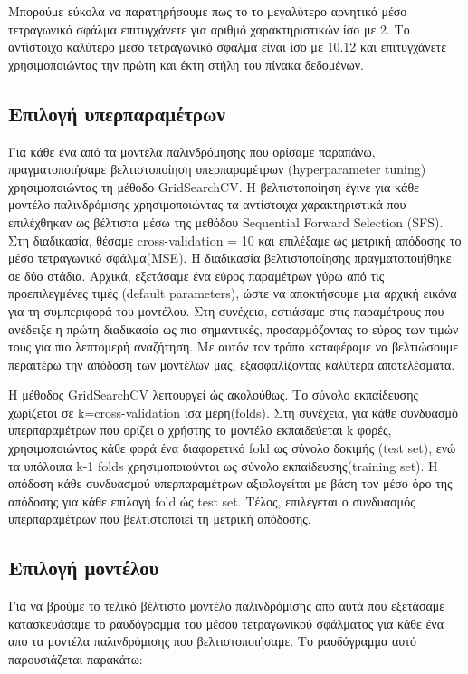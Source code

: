 \documentclass[12pt]{article}
\begin{document}
Μπορούμε εύκολα να παρατηρήσουμε πως το το μεγαλύτερο αρνητικό μέσο τετραγωνικό σφάλμα επιτυγχάνετε για αριθμό χαρακτηριστικών ίσο με 2. Το αντίστοιχο καλύτερο μέσο τετραγωνικό σφάλμα είναι ίσο με 10.12 και επιτυγχάνετε χρησιμοποιώντας την πρώτη και έκτη στήλη του πίνακα δεδομένων.

\subsection{Επιλογή υπερπαραμέτρων}
Για κάθε ένα από τα μοντέλα παλινδρόμησης που ορίσαμε παραπάνω, πραγματοποιήσαμε βελτιστοποίηση υπερπαραμέτρων (hyperparameter tuning) χρησιμοποιώντας τη μέθοδο GridSearchCV. Η βελτιστοποίηση έγινε για κάθε μοντέλο παλινδρόμισης χρησιμοποιώντας τα αντίστοιχα χαρακτηριστικά που επιλέχθηκαν ως βέλτιστα μέσω της μεθόδου Sequential Forward Selection (SFS). Στη διαδικασία, θέσαμε cross-validation = 10 και επιλέξαμε ως μετρική απόδοσης το μέσο τετραγωνικό σφάλμα(MSE). Η διαδικασία βελτιστοποίησης πραγματοποιήθηκε σε δύο στάδια. Aρχικά, εξετάσαμε ένα εύρος παραμέτρων γύρω από τις προεπιλεγμένες τιμές (default parameters), ώστε να αποκτήσουμε μια αρχική εικόνα για τη συμπεριφορά του μοντέλου. Στη συνέχεια, εστιάσαμε στις παραμέτρους που ανέδειξε η πρώτη διαδικασία ως πιο σημαντικές, προσαρμόζοντας το εύρος των τιμών τους για πιο λεπτομερή αναζήτηση. Με αυτόν τον τρόπο καταφέραμε να βελτιώσουμε περαιτέρω την απόδοση των μοντέλων μας, εξασφαλίζοντας καλύτερα αποτελέσματα.

Η μέθοδος GridSearchCV λειτουργεί ώς ακολούθως.
Το σύνολο εκπαίδευσης χωρίζεται σε k=cross-validation ίσα μέρη(folds). Στη συνέχεια, για κάθε συνδυασμό υπερπαραμέτρων που ορίζει ο χρήστης το μοντέλο εκπαιδεύεται k φορές, χρησιμοποιώντας κάθε φορά ένα διαφορετικό fold ως σύνολο δοκιμής (test set), ενώ τα υπόλοιπα k-1 folds χρησιμοποιούνται ως σύνολο εκπαίδευσης(training set). Η απόδοση κάθε συνδυασμού υπερπαραμέτρων αξιολογείται με βάση τον μέσο όρο της απόδοσης για κάθε επιλογή fold ώς test set. Τέλος, επιλέγεται ο συνδυασμός υπερπαραμέτρων που βελτιστοποιεί τη μετρική απόδοσης.
\subsection{Επιλογή μοντέλου}
Για να βρούμε το τελικό βέλτιστο μοντέλο παλινδρόμισης απο αυτά που εξετάσαμε κατασκευάσαμε το ραυδόγραμμα του μέσου τετραγωνικού σφάλματος για κάθε ένα απο τα μοντέλα παλινδρόμισης που βελτιστοποιήσαμε. Το ραυδόγραμμα αυτό παρουσιάζεται παρακάτω: 
\end{document}
